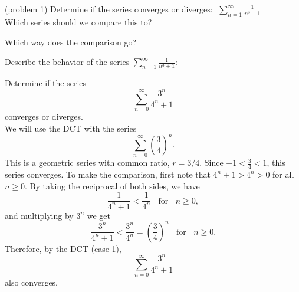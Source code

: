 \documentclass[handout]{ximera}
\begin{document}
\begin{problem}(problem 1)
Determine if the series converges or 
diverges: $\;\displaystyle{\sum_{n=1}^\infty \frac{1}{n^3 + 1}}$ \\

Which series should we compare this to?

\begin{multipleChoice}
\end{multipleChoice}

Which way does the comparison go?

\begin{multipleChoice}
\end{multipleChoice}


Describe the behavior of the series $\displaystyle{\sum_{n=1}^\infty \frac{1}{n^3 + 1}:}$
\begin{multipleChoice}
\end{multipleChoice}


\end{problem}


\begin{example}[example 2] %
Determine if the series 
\[
\sum_{n=0}^\infty \frac{3^n}{4^n + 1}
\]
 converges or diverges.\\
We will use the DCT with the series 
\[
\sum_{n=0}^\infty \left(\frac34\right)^n.
\]
 This is a geometric series with common ratio, $r = 3/4$. Since $-1 < \frac 34 < 1$, this series converges.
To make the comparison, first note that $4^n + 1 > 4^n > 0$ for all $n \geq 0$. By taking the reciprocal of both sides,
we have 
\[
\frac{1}{4^n + 1} < \frac{1}{4^n} \; \; \text{ for } \;\; n \geq 0,
\]
and multiplying by $3^n$ we get
\[
\frac{3^n}{4^n + 1} < \frac{3^n}{4^n} = \left(\frac34\right)^n \;\; \text{ for } \;\; n \geq 0.
\]
Therefore, by the DCT (case 1), 
\[
\sum_{n=0}^\infty \frac{3^n}{4^n + 1}
\]
 also converges.
\end{example}
\end{document}
